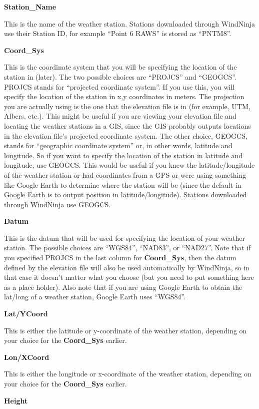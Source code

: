 \documentclass[12pt]{article}
\begin{document}
\textbf{Station\_Name}

This is the name of the weather station. Stations downloaded through WindNinja use their Station ID, for example “Point 6 RAWS” is stored as “PNTM8”.

\textbf{Coord\_Sys}

This is the coordinate system that you will be specifying the location of the station in (later).  The two possible choices are “PROJCS” and “GEOGCS”.  PROJCS stands for “projected coordinate system”.  If you use this, you will specify the location of the station in x,y coordinates in meters.  The projection you are actually using is the one that the elevation file is in (for example, UTM, Albers, etc.).  This might be useful if you are viewing your elevation file and locating the weather stations in a GIS, since the GIS probably outputs locations in the elevation file's projected coordinate system.  The other choice, GEOGCS, stands for “geographic coordinate system” or, in other words, latitude and longitude.  So if you want to specify the location of the station in latitude and longitude, use GEOGCS.  This would be useful if you knew the latitude/longitude of the weather station or had coordinates from a GPS or were using something like Google Earth to determine where the station will be (since the default in Google Earth is to output position in latitude/longitude). Stations downloaded through WindNinja use GEOGCS.

\textbf{Datum}

This is the datum that will be used for specifying the location of your weather station.  The possible choices are “WGS84”, “NAD83”, or “NAD27”.  Note that if you specified PROJCS in the last column for \textbf{Coord\_Sys}, then the datum defined by the elevation file will also be used automatically by WindNinja, so in that case it doesn't matter what you choose (but you need to put something here as a place holder).  Also note that if you are using Google Earth to obtain the lat/long of a weather station, Google Earth uses “WGS84”.

\textbf{Lat/YCoord}

This is either the latitude or y-coordinate of the weather station, depending on your choice for the \textbf{Coord\_Sys} earlier.

\textbf{Lon/XCoord}

This is either the longitude or x-coordinate of the weather station, depending on your choice for the \textbf{Coord\_Sys} earlier.

\textbf{Height}
\end{document}

